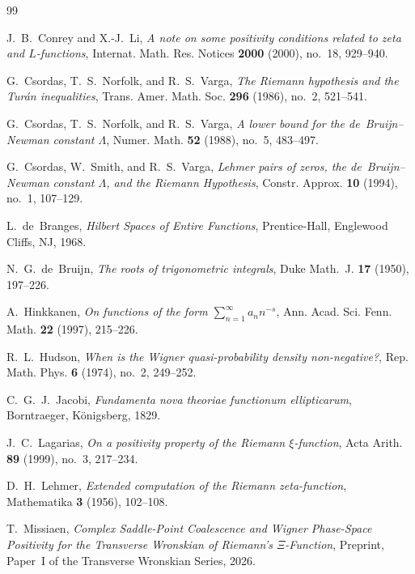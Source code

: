 \documentclass[11pt,reqno]{amsart}
\theoremstyle{definition}
\theoremstyle{remark}
\numberwithin{equation}{section}
\begin{document}
\begin{thebibliography}{99}

J.~B.~Conrey and X.-J.~Li,
\emph{A note on some positivity conditions related to zeta and $L$-functions},
Internat. Math. Res. Notices \textbf{2000} (2000), no.~18, 929--940.

G.~Csordas, T.~S.~Norfolk, and R.~S.~Varga,
\emph{The Riemann hypothesis and the Tur\'an inequalities},
Trans. Amer. Math. Soc. \textbf{296} (1986), no.~2, 521--541.

G.~Csordas, T.~S.~Norfolk, and R.~S.~Varga,
\emph{A lower bound for the de~Bruijn--Newman constant $\Lambda$},
Numer. Math. \textbf{52} (1988), no.~5, 483--497.

G.~Csordas, W.~Smith, and R.~S.~Varga,
\emph{Lehmer pairs of zeros, the de~Bruijn--Newman constant $\Lambda$, and the Riemann Hypothesis},
Constr. Approx. \textbf{10} (1994), no.~1, 107--129.

L.~de~Branges,
\emph{Hilbert Spaces of Entire Functions},
Prentice-Hall, Englewood Cliffs, NJ, 1968.

N.~G.~de~Bruijn,
\emph{The roots of trigonometric integrals},
Duke Math.~J. \textbf{17} (1950), 197--226.

A.~Hinkkanen,
\emph{On functions of the form $\sum_{n=1}^{\infty} a_n n^{-s}$},
Ann. Acad. Sci. Fenn. Math. \textbf{22} (1997), 215--226.

R.~L.~Hudson,
\emph{When is the Wigner quasi-probability density non-negative?},
Rep. Math. Phys. \textbf{6} (1974), no.~2, 249--252.

C.~G.~J.~Jacobi,
\emph{Fundamenta nova theoriae functionum ellipticarum},
Borntraeger, K\"onigsberg, 1829.

J.~C.~Lagarias,
\emph{On a positivity property of the Riemann $\xi$-function},
Acta Arith. \textbf{89} (1999), no.~3, 217--234.

D.~H.~Lehmer,
\emph{Extended computation of the Riemann zeta-function},
Mathematika \textbf{3} (1956), 102--108.

T.~Missiaen,
\emph{Complex Saddle-Point Coalescence and Wigner Phase-Space Positivity for the Transverse Wronskian of Riemann's $\Xi$-Function},
Preprint, Paper~I of the Transverse Wronskian Series, 2026.


\end{thebibliography}
\end{document}
